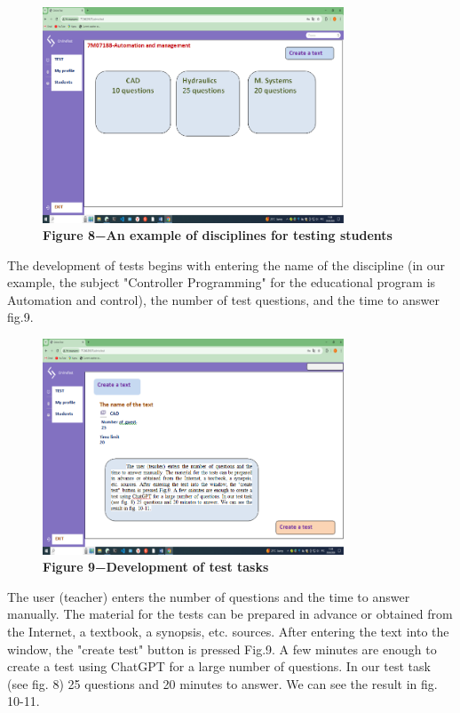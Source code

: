 \begin{figure}[H]
	\centering
	\includegraphics[width=0.8\textwidth]{assets/133}
	\caption*{\bfseries Figure 8−An example of disciplines for testing students}
\end{figure}



\begin{multicols}{2}
The development of tests begins with entering the name of the discipline
(in our example, the subject "Controller Programming" for the
educational program is Automation and control), the number of test
questions, and the time to answer fig.9.
\end{multicols}

\begin{figure}[H]
	\centering
	\includegraphics[width=0.8\textwidth]{assets/134}
	\caption*{\bfseries Figure 9−Development of test tasks}
\end{figure}

\begin{multicols}{2}

The user (teacher) enters the number of questions and the time to answer
manually. The material for the tests can be prepared in advance or
obtained from the Internet, a textbook, a synopsis, etc. sources. After
entering the text into the window, the "create test" button is pressed
Fig.9. A few minutes are enough to create a test using ChatGPT for a
large number of questions. In our test task (see fig. 8) 25 questions
and 20 minutes to answer. We can see the result in fig. 10-11.
\end{multicols}



